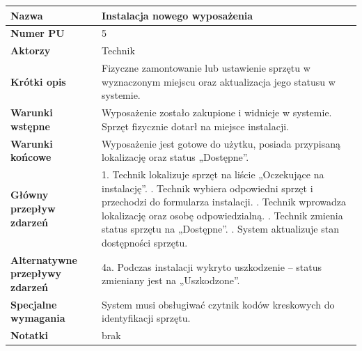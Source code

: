 \documentclass{article}
\begin{document}
    \begin{tabular}{|m{10em}|m{20em}|}
        \hline
        \textbf{Nazwa} & Instalacja nowego wyposażenia \\
        \hline
        \textbf{Numer PU} & 5 \\
        \hline
        \textbf{Aktorzy} & Technik \\
        \hline
        \textbf{Krótki opis} & Fizyczne zamontowanie lub ustawienie sprzętu w wyznaczonym miejscu oraz aktualizacja jego statusu w systemie. \\
        \hline
        \textbf{Warunki wstępne} & Wyposażenie zostało zakupione i widnieje w systemie. Sprzęt fizycznie dotarł na miejsce instalacji. \\
        \hline
        \textbf{Warunki końcowe} & Wyposażenie jest gotowe do użytku, posiada przypisaną lokalizację oraz status „Dostępne”. \\
        \hline
        \textbf{Główny przepływ zdarzeń} & 
            1. Technik lokalizuje sprzęt na liście „Oczekujące na instalację”. \newline
            2. Technik wybiera odpowiedni sprzęt i przechodzi do formularza instalacji. \newline
            3. Technik wprowadza lokalizację oraz osobę odpowiedzialną. \newline
            4. Technik zmienia status sprzętu na „Dostępne”. \newline
            5. System aktualizuje stan dostępności sprzętu. \\
        \hline
        \textbf{Alternatywne przepływy zdarzeń} & 
            4a. Podczas instalacji wykryto uszkodzenie – status zmieniany jest na „Uszkodzone”. \\
        \hline
        \textbf{Specjalne wymagania} & System musi obsługiwać czytnik kodów kreskowych do identyfikacji sprzętu. \\
        \hline
        \textbf{Notatki} & brak \\
        \hline
    \end{tabular}

    \vspace{1cm}
\end{document}
